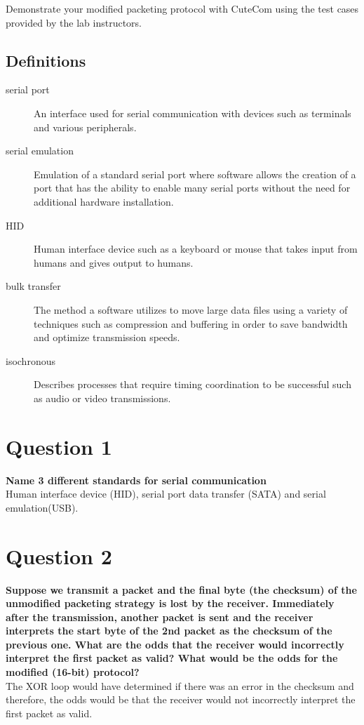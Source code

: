 \documentclass{article}
\begin{document}
Demonstrate your modified packeting protocol with CuteCom using the test cases provided by the lab instructors. 


\subsection{Definitions}
\label{definitions}
\begin{description}
\item[serial port]
 An interface used for serial communication with devices such as terminals and various peripherals. 
\item[serial emulation]
Emulation of a standard serial port where software allows the creation of a port that has the ability to enable many serial ports without the need for additional hardware installation.
\item[HID]
Human interface device such as a keyboard or mouse that takes input from humans and gives output to humans. 
\item[bulk transfer]
The method a software utilizes to move large data files using a variety of techniques such as compression and buffering in order to save bandwidth and optimize transmission speeds. 
\item[isochronous]
Describes processes that require timing coordination to be successful such as audio or video transmissions. 
\end{description} 
 

\section{Question 1}
\textbf{Name 3 different standards for serial communication}\\ 

Human interface device (HID), serial port data transfer (SATA) and serial emulation(USB).

\section{Question 2}
\textbf{Suppose we transmit a packet and the final byte (the checksum) of the unmodified packeting strategy is lost by the receiver. Immediately after the transmission, another packet is sent and the receiver interprets the start byte of the 2nd packet as the checksum of the previous one. What are the odds that the receiver would incorrectly interpret the first packet as valid? What would be the odds for the modified (16-bit) protocol?}\\

The XOR loop would have determined if there was an error in the checksum and therefore, the odds would be that the receiver would not incorrectly interpret the first packet as valid.
\end{document}
